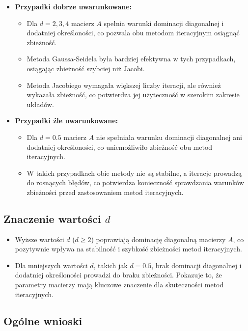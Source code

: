 \documentclass[a4paper,12pt]{article}
\begin{document}
\begin{itemize}
    \item \textbf{Przypadki dobrze uwarunkowane:} 
    \begin{itemize}
        \item Dla \(d = 2, 3, 4\) macierz \(A\) spełnia warunki dominacji diagonalnej i dodatniej określoności, co pozwala obu metodom iteracyjnym osiągnąć zbieżność.
        \item Metoda Gaussa-Seidela była bardziej efektywna w tych przypadkach, osiągając zbieżność szybciej niż Jacobi.
        \item Metoda Jacobiego wymagała większej liczby iteracji, ale również wykazała zbieżność, co potwierdza jej użyteczność w szerokim zakresie układów.
    \end{itemize}

    \item \textbf{Przypadki źle uwarunkowane:}
    \begin{itemize}
        \item Dla \(d = 0.5\) macierz \(A\) nie spełniała warunku dominacji diagonalnej ani dodatniej określoności, co uniemożliwiło zbieżność obu metod iteracyjnych.
        \item W takich przypadkach obie metody nie są stabilne, a iteracje prowadzą do rosnących błędów, co potwierdza konieczność sprawdzania warunków zbieżności przed zastosowaniem metod iteracyjnych.
    \end{itemize}
\end{itemize}

\subsection{Znaczenie wartości \(d\)}

\begin{itemize}
    \item Wyższe wartości \(d\) (\(d \geq 2\)) poprawiają dominację diagonalną macierzy \(A\), co pozytywnie wpływa na stabilność i szybkość zbieżności metod iteracyjnych.
    \item Dla mniejszych wartości \(d\), takich jak \(d = 0.5\), brak dominacji diagonalnej i dodatniej określoności prowadzi do braku zbieżności. Pokazuje to, że parametry macierzy mają kluczowe znaczenie dla skuteczności metod iteracyjnych.
\end{itemize}

\subsection{Ogólne wnioski}
\end{document}
